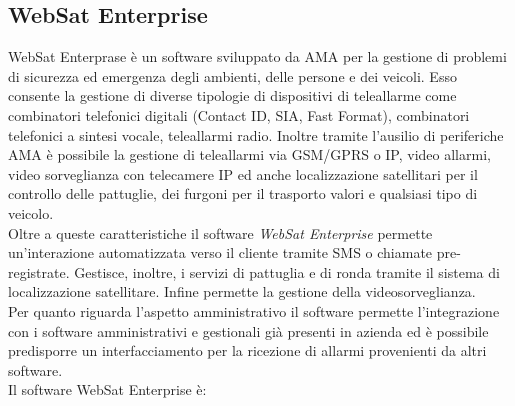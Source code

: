 \subsection{WebSat Enterprise}
WebSat Enterprase è un software sviluppato da AMA per la gestione di problemi di sicurezza ed emergenza degli ambienti, delle persone e dei veicoli. Esso consente la gestione di diverse tipologie di dispositivi di teleallarme come combinatori telefonici digitali (Contact ID, SIA, Fast Format), combinatori telefonici a sintesi vocale, teleallarmi radio. Inoltre tramite l'ausilio di periferiche AMA è possibile la gestione di teleallarmi via GSM/GPRS o IP, video allarmi, video sorveglianza con telecamere IP ed anche localizzazione satellitari per il controllo delle pattuglie, dei furgoni per il trasporto valori e qualsiasi tipo di veicolo.\\
Oltre a queste caratteristiche il software \emph{WebSat Enterprise} permette un'interazione automatizzata verso il cliente tramite SMS o chiamate pre-registrate. Gestisce, inoltre, i servizi di pattuglia e di ronda tramite il sistema di localizzazione satellitare. Infine permette la gestione della videosorveglianza.\\
Per quanto riguarda l'aspetto amministrativo il software permette l'integrazione con i software amministrativi e gestionali già presenti in azienda ed è  possibile predisporre un interfacciamento per la ricezione di allarmi provenienti da altri software.\\
Il software WebSat Enterprise è:
